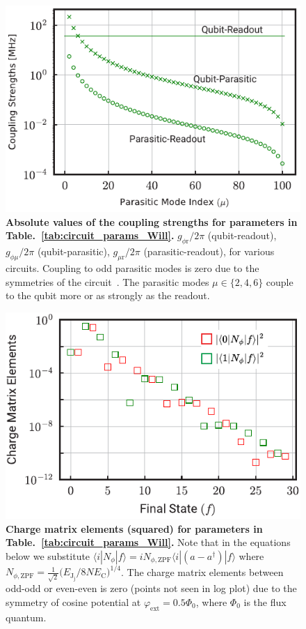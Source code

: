 \documentclass[%
reprint,
superscriptaddress,
 amsmath,amssymb,
 aps,
 prx,
longbibliography,
floatfix,
]{revtex4-2}
\begin{document}
{\begin{figure}
    \label{fig:Trans2}
\end{figure}
\begin{figure}[htb]
    \centering
    \includegraphics[width=\linewidth]{Supp_Fig/Coupling-Will.pdf}
    \caption{{\bf Absolute values of the coupling strengths for parameters in Table.~\ref{tab:circuit_params_Will}.} $g_{\phi \textrm{r}}/2\pi$ (qubit-readout), $g_{\phi\mu}/2\pi$ (qubit-parasitic), $g_{\mu \textrm{r}}/2\pi$ (parasitic-readout), for various circuits. Coupling to odd parasitic modes is zero due to the symmetries of the circuit~\cite{viola2015collective}. The parasitic modes $\mu\in\{2,4,6\}$ couple to the qubit more or as strongly as the readout.}
    \label{fig:coupling-strength-Will}
\end{figure}
\begin{figure}[htb]
    \centering
    \includegraphics[width=\linewidth]{Supp_Fig/Charge-matrix-Will.pdf}
    \caption{{\bf Charge matrix 
 elements (squared) for parameters in Table.~\ref{tab:circuit_params_Will}.} Note that in the equations below we substitute $\langle i|N_\phi|f\rangle=iN_{\phi,\mathrm{ZPF}}\langle i|(a-a^\dagger)|f\rangle$ where $N_{\phi,\mathrm{ZPF}}=\frac{1}{\sqrt{2}}\Big(E_{\textrm{J}_\textrm{j}}/8NE_{\textrm{C}}\Big)^{1/4}$. The charge matrix elements between odd-odd or even-even is zero (points not seen in log plot) due to the symmetry of cosine potential at $\varphi_\mathrm{ext}=0.5\Phi_0$, where $\Phi_0$ is the flux quantum.}
    \label{fig:charge-matrix-Will}
\end{figure}

}
\end{document}

